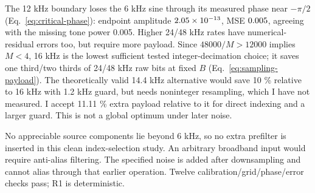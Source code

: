 The 12 kHz boundary loses the 6 kHz sine through its measured phase near
$-\pi/2 $ (Eq.~\eqref{eq:critical-phase}): endpoint amplitude
$2.05\times10^{-13} $, MSE $0.005 $, agreeing with the missing
tone power 0.005. Higher 24/48 kHz rates have numerical-residual errors too,
but require more payload. Since $48000/M>12000 $ implies $ M<4 $,
16 kHz is the lowest sufficient tested integer-decimation choice;
it saves one third/two thirds of 24/48 kHz raw bits at fixed $ B $
(Eq.~\eqref{eq:sampling-payload}). The theoretically valid 14.4 kHz
alternative would save 10 \% relative to 16 kHz with 1.2 kHz guard, but needs
noninteger resampling, which I have not measured. I accept 11.11 \% extra
payload relative to it for direct indexing and a larger guard.
This is not a global optimum under later noise.

No appreciable source components lie beyond 6 kHz, so no extra prefilter
is inserted in this clean index-selection study. An arbitrary broadband
input would require anti-alias filtering. The specified noise is added
after downsampling and cannot alias through that earlier operation.
Twelve calibration/grid/phase/error checks pass; R1 is deterministic.
